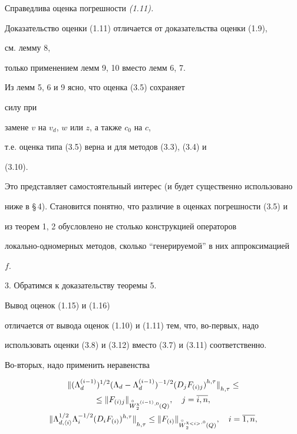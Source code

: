 \begin{lem}


Справедлива оценка погрешности {\em (1.11).}


\end{lem}





Доказательство оценки (1.11) отличается от доказательства оценки (1.9), 


см. лемму 8, 


только применением лемм 9, 10 вместо лемм 6, 7.





\begin{note} Из лемм 5, 6 и 9 ясно, что оценка (3.5) сохраняет 


силу при


замене $v$ на $v_d$, $w$ или $z$, а также $c_0$ на $c$,


т.е. оценка типа (3.5) верна и для методов (3.3), (3.4) и 


(3.10).


Это представляет самостоятельный интерес (и будет существенно использовано


ниже в \S\,4). Становится понятно, что различие в оценках погрешности (3.5) и 


из теорем 1, 2 обусловлено не столько конструкцией операторов


локально-одномерных методов, сколько ``генерируемой'' в них аппроксимацией


$f$.


\end{note}





3. Обратимся к доказательству теоремы 5. 


Вывод оценок (1.15) и (1.16)


отличается от вывода оценок (1.10) и (1.11) тем, что, во-первых, надо


использовать оценки (3.8) и (3.12) вместо (3.7) и (3.11) соответственно.


Во-вторых, надо применить неравенства


\begin{gather*}


{\ver (\Lambda_d^{(i-1)})^{1/2}(\Lambda_d-\Lambda_d^{(i-1)})^{-1/2}


{(D_jF_{(i)j})}^{h,\tau}\ver}_{h,\tau}\le \\


%


\le{\ver F_{(i)j}


\ver}_{\overset{\circ}{W}{}^{\chi^{(i-1)},0}_2(Q)},


\quad j=\overline{i,n},\\


%


{\ver \Lambda_{d,\langle i\rangle}^{1/2}\Lambda_i^{-1/2}(D_iF_{(i)})^{h,\tau}


\ver}_{h,\tau}\le{\ver F_{(i)}


\ver}_{\overset{\circ}{W}{}^{\chi_{<i>},0}_2(Q)},\quad i=\overline{1,n},


\end{gather*}


